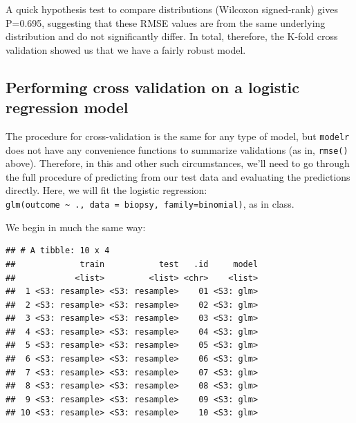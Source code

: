 \documentclass[]{article}
\newenvironment{Shaded}{\begin{snugshade}}{\end{snugshade}}
\newcommand{\KeywordTok}[1]{\textcolor[rgb]{0.13,0.29,0.53}{\textbf{#1}}}
\newcommand{\DataTypeTok}[1]{\textcolor[rgb]{0.13,0.29,0.53}{#1}}
\newcommand{\DecValTok}[1]{\textcolor[rgb]{0.00,0.00,0.81}{#1}}
\newcommand{\StringTok}[1]{\textcolor[rgb]{0.31,0.60,0.02}{#1}}
\newcommand{\OperatorTok}[1]{\textcolor[rgb]{0.81,0.36,0.00}{\textbf{#1}}}
\newcommand{\NormalTok}[1]{#1}
\begin{document}
A quick hypothesis test to compare distributions (Wilcoxon signed-rank)
gives P=0.695, suggesting that these RMSE values are from the same
underlying distribution and do not significantly differ. In total,
therefore, the K-fold cross validation showed us that we have a fairly
robust model.

\subsection{Performing cross validation on a logistic regression
model}\label{performing-cross-validation-on-a-logistic-regression-model}

The procedure for cross-validation is the same for any type of model,
but \texttt{modelr} does not have any convenience functions to summarize
validations (as in, \texttt{rmse()} above). Therefore, in this and other
such circumstances, we'll need to go through the full procedure of
predicting from our test data and evaluating the predictions directly.
Here, we will fit the logistic regression:
\texttt{glm(outcome\ \textasciitilde{}\ .,\ data\ =\ biopsy,\ family=binomial)},
as in class.

We begin in much the same way:

\begin{Shaded}
\end{Shaded}

\begin{verbatim}
## # A tibble: 10 x 4
##             train           test   .id     model
##            <list>         <list> <chr>    <list>
##  1 <S3: resample> <S3: resample>    01 <S3: glm>
##  2 <S3: resample> <S3: resample>    02 <S3: glm>
##  3 <S3: resample> <S3: resample>    03 <S3: glm>
##  4 <S3: resample> <S3: resample>    04 <S3: glm>
##  5 <S3: resample> <S3: resample>    05 <S3: glm>
##  6 <S3: resample> <S3: resample>    06 <S3: glm>
##  7 <S3: resample> <S3: resample>    07 <S3: glm>
##  8 <S3: resample> <S3: resample>    08 <S3: glm>
##  9 <S3: resample> <S3: resample>    09 <S3: glm>
## 10 <S3: resample> <S3: resample>    10 <S3: glm>
\end{verbatim}
\end{document}
